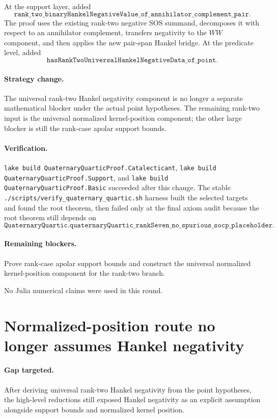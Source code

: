 \documentclass[11pt]{article}
\begin{document}
At the support layer, added
\[
\texttt{rank\_two\_binaryHankelNegativeValue\_of\_annihilator\_complement\_pair}.
\]
The proof uses the existing rank-two negative SOS summand, decomposes it with
respect to an annihilator complement, transfers negativity to the \(W W\)
component, and then applies the new pair-span Hankel bridge.  At the predicate
level, added
\[
\texttt{hasRankTwoUniversalHankelNegativeData\_of\_point}.
\]

\paragraph{Strategy change.}
The universal rank-two Hankel negativity component is no longer a separate
mathematical blocker under the actual point hypotheses.  The remaining
rank-two input is the universal normalized kernel-position component; the other
large blocker is still the rank-case apolar support bounds.

\paragraph{Verification.}
\texttt{lake build QuaternaryQuarticProof.Catalecticant},
\texttt{lake build QuaternaryQuarticProof.Support}, and
\texttt{lake build QuaternaryQuarticProof.Basic} succeeded after this change.
The stable \texttt{./scripts/verify\_quaternary\_quartic.sh} harness built the
selected targets and found the root theorem, then failed only at the final axiom
audit because the root theorem still depends on
\[
\texttt{QuaternaryQuartic.quaternaryQuartic\_rankSeven\_no\_spurious\_socp\_placeholder}.
\]

\paragraph{Remaining blockers.}
Prove rank-case apolar support bounds and construct the universal normalized
kernel-position component for the rank-two branch.

No Julia numerical claims were used in this round.

\section*{Normalized-position route no longer assumes Hankel negativity}

\paragraph{Gap targeted.}
After deriving universal rank-two Hankel negativity from the point hypotheses,
the high-level reductions still exposed Hankel negativity as an explicit
assumption alongside support bounds and normalized kernel position.
\end{document}
